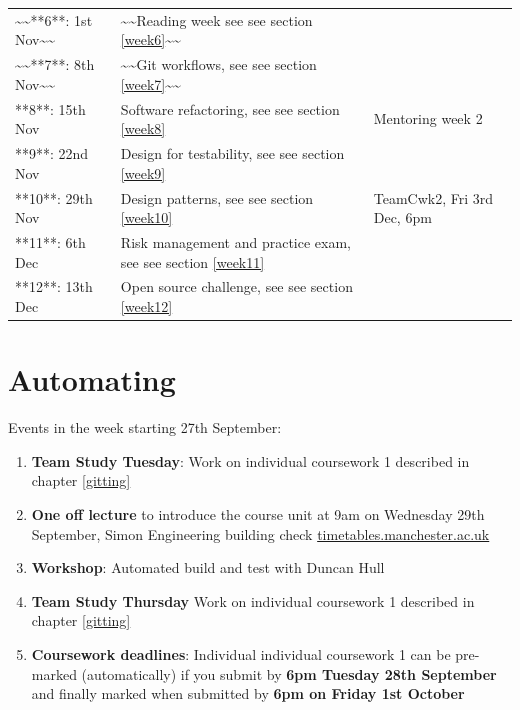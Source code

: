 \documentclass[
]{book}
\providecommand{\tightlist}{%
  \setlength{\itemsep}{0pt}\setlength{\parskip}{0pt}}
\begin{document}
\begin{table}
\begin{tabular}[t]{lll}
\addlinespace
\textasciitilde{}\textasciitilde{}**6**: 1st Nov\textasciitilde{}\textasciitilde{} & \textasciitilde{}\textasciitilde{}Reading week see see section \ref{week6}\textasciitilde{}\textasciitilde{} & \\
\textasciitilde{}\textasciitilde{}**7**: 8th Nov\textasciitilde{}\textasciitilde{} & \textasciitilde{}\textasciitilde{}Git workflows, see see section \ref{week7}\textasciitilde{}\textasciitilde{} & \\
**8**: 15th Nov & Software refactoring, see see section \ref{week8} & Mentoring week 2\\
**9**: 22nd Nov & Design for testability, see see section \ref{week9} & \\
**10**: 29th Nov & Design patterns, see see section \ref{week10} & TeamCwk2, Fri 3rd Dec, 6pm\\
\addlinespace
**11**: 6th Dec & Risk management and practice exam, see see section \ref{week11} & \\
**12**: 13th Dec & Open source challenge, see see section \ref{week12} & \\
\bottomrule
\end{tabular}
\end{table}

\hypertarget{week1}{%
\section{Automating}\label{week1}}

Events in the week starting 27th September:

\begin{enumerate}
\def\labelenumi{\arabic{enumi}.}
\tightlist
\item
  \textbf{Team Study Tuesday}: Work on individual coursework 1 described in chapter \ref{gitting}
\item
  \textbf{One off lecture} to introduce the course unit at 9am on Wednesday 29th September, Simon Engineering building check \href{https://timetables.manchester.ac.uk/}{timetables.manchester.ac.uk}
\item
  \textbf{Workshop}: Automated build and test with Duncan Hull
\item
  \textbf{Team Study Thursday} Work on individual coursework 1 described in chapter \ref{gitting}
\item
  \textbf{Coursework deadlines}: Individual individual coursework 1 can be pre-marked (automatically) if you submit by \textbf{6pm Tuesday 28th September} and finally marked when submitted by \textbf{6pm on Friday 1st October}
\end{enumerate}
\end{document}
